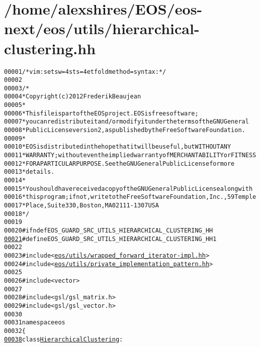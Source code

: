 \hypertarget{hierarchical-clustering_8hh_source}{
\section{/home/alexshires/EOS/eos-\/next/eos/utils/hierarchical-\/clustering.hh}
}


\begin{footnotesize}\begin{alltt}
00001 \textcolor{comment}{/* vim: set sw=4 sts=4 et foldmethod=syntax : */}
00002 
00003 \textcolor{comment}{/*}
00004 \textcolor{comment}{ * Copyright (c) 2012 Frederik Beaujean}
00005 \textcolor{comment}{ *}
00006 \textcolor{comment}{ * This file is part of the EOS project. EOS is free software;}
00007 \textcolor{comment}{ * you can redistribute it and/or modify it under the terms of the GNU General}
00008 \textcolor{comment}{ * Public License version 2, as published by the Free Software Foundation.}
00009 \textcolor{comment}{ *}
00010 \textcolor{comment}{ * EOS is distributed in the hope that it will be useful, but WITHOUT ANY}
00011 \textcolor{comment}{ * WARRANTY; without even the implied warranty of MERCHANTABILITY or FITNESS}
00012 \textcolor{comment}{ * FOR A PARTICULAR PURPOSE.  See the GNU General Public License for more}
00013 \textcolor{comment}{ * details.}
00014 \textcolor{comment}{ *}
00015 \textcolor{comment}{ * You should have received a copy of the GNU General Public License along with}
00016 \textcolor{comment}{ * this program; if not, write to the Free Software Foundation, Inc., 59 Temple}
00017 \textcolor{comment}{ * Place, Suite 330, Boston, MA  02111-1307  USA}
00018 \textcolor{comment}{ */}
00019 
00020 \textcolor{preprocessor}{#ifndef EOS\_GUARD\_SRC\_UTILS\_HIERARCHICAL\_CLUSTERING\_HH}
\hypertarget{hierarchical-clustering_8hh_source_l00021}{}\hyperlink{hierarchical-clustering_8hh_a1d869f2ababc1f554edea4a220d22a62}{00021} \textcolor{preprocessor}{}\textcolor{preprocessor}{#define EOS\_GUARD\_SRC\_UTILS\_HIERARCHICAL\_CLUSTERING\_HH 1}
00022 \textcolor{preprocessor}{}
00023 \textcolor{preprocessor}{#include <\hyperlink{wrapped__forward__iterator-impl_8hh}{eos/utils/wrapped_forward_iterator-impl.hh}>}
00024 \textcolor{preprocessor}{#include <\hyperlink{private__implementation__pattern_8hh}{eos/utils/private_implementation_pattern.hh}>}
00025 
00026 \textcolor{preprocessor}{#include <vector>}
00027 
00028 \textcolor{preprocessor}{#include <gsl/gsl\_matrix.h>}
00029 \textcolor{preprocessor}{#include <gsl/gsl\_vector.h>}
00030 
00031 \textcolor{keyword}{namespace }eos
00032 \{
\hypertarget{hierarchical-clustering_8hh_source_l00038}{}\hyperlink{classeos_1_1HierarchicalClustering}{00038}     \textcolor{keyword}{class }\hyperlink{classeos_1_1HierarchicalClustering}{HierarchicalClustering} :

\end{alltt}
\end{footnotesize}
